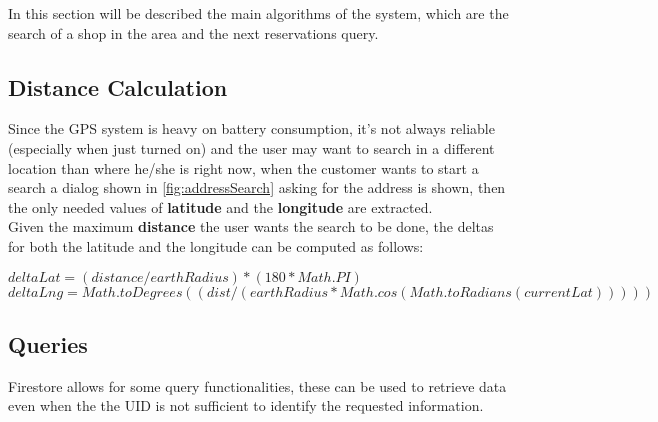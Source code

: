 In this section will be described the main algorithms of the system, which are the search of a shop in the area and the next reservations query.
\subsection{Distance Calculation}
Since the GPS system is heavy on battery consumption, it's not always reliable (especially when just turned on) and the user may want to search in a different location than where he/she is right now, when the customer wants to start a search a dialog shown in \autoref{fig:addressSearch} asking for the address is shown, then the only needed values of \textbf{latitude} and the \textbf{longitude} are extracted.\\
Given the maximum \textbf{distance} the user wants the search to be done, the deltas for both the latitude and the longitude can be computed as follows:\\
\begin{center}
$ deltaLat = (distance/earthRadius) * (180 * Math.PI) $\\\vspace{0.5cm}
$ deltaLng = Math.toDegrees((dist / (earthRadius * Math.cos(Math.toRadians(currentLat))))) $
\end{center}
\subsection{Queries}
Firestore allows for some query functionalities, these can be used to retrieve data even when the the UID is not sufficient to identify the requested information.
